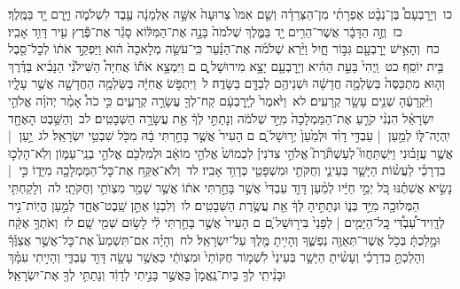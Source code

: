 \documentclass[18pt]{article}
\begin{document}
 {\loc כו~}וְיָרׇבְעָם֩ בֶּן־נְבָ֨ט אֶפְרָתִ֜י מִן־הַצְּרֵדָ֗ה וְשֵׁ֤ם אִמּוֹ֙ צְרוּעָה֙ אִשָּׁ֣ה אַלְמָנָ֔ה עֶ֖בֶד לִשְׁלֹמֹ֑ה וַיָּ֥רֶם יָ֖ד בַּמֶּֽלֶךְ׃ \startlock
 {\loc כז~}וְזֶ֣ה הַדָּבָ֔ר אֲשֶׁר־הֵרִ֥ים יָ֖ד בַּמֶּ֑לֶךְ שְׁלֹמֹה֙ בָּנָ֣ה אֶת־הַמִּלּ֔וֹא סָגַ֕ר אֶת־פֶּ֕רֶץ עִ֖יר דָּוִ֥ד אָבִֽיו׃ \startlock
 {\loc כח~}וְהָאִ֥ישׁ יָרׇבְעָ֖ם גִּבּ֣וֹר חָ֑יִל וַיַּ֨רְא שְׁלֹמֹ֜ה אֶת־הַנַּ֗עַר כִּֽי־עֹשֵׂ֤ה מְלָאכָה֙ ה֔וּא וַיַּפְקֵ֣ד אֹת֔וֹ לְכׇל־סֵ֖בֶל בֵּ֥ית יוֹסֵֽף׃ \startlock
 {\loc כט~}וַֽיְהִי֙ בָּעֵ֣ת הַהִ֔יא וְיָרׇבְעָ֖ם יָצָ֣א מִירוּשָׁל ָ֑͏ְם ם וַיִּמְצָ֣א אֹת֡וֹ אֲחִיָּה֩ הַשִּׁילֹנִ֨י הַנָּבִ֜יא בַּדֶּ֗רֶךְ וְה֤וּא מִתְכַּסֶּה֙ בְּשַׂלְמָ֣ה חֲדָשָׁ֔ה וּשְׁנֵיהֶ֥ם לְבַדָּ֖ם בַּשָּׂדֶֽה׃ \startlock
 {\loc ל~}וַיִּתְפֹּ֣שׂ אֲחִיָּ֔ה בַּשַּׂלְמָ֥ה הַחֲדָשָׁ֖ה אֲשֶׁ֣ר עָלָ֑יו וַיִּ֨קְרָעֶ֔הָ שְׁנֵ֥ים עָשָׂ֖ר קְרָעִֽים׃ \startlock
 {\loc לא~}וַיֹּ֙אמֶר֙ לְיָֽרׇבְעָ֔ם קַח־לְךָ֖ עֲשָׂרָ֣ה קְרָעִ֑ים כִּ֣י כֹה֩ אָמַ֨ר יְהֹוָ֜ה אֱלֹהֵ֣י יִשְׂרָאֵ֗ל הִנְנִ֨י קֹרֵ֤עַ אֶת־הַמַּמְלָכָה֙ מִיַּ֣ד שְׁלֹמֹ֔ה וְנָתַתִּ֣י לְךָ֔ אֵ֖ת עֲשָׂרָ֥ה הַשְּׁבָטִֽים׃ \startlock
 {\loc לב~}וְהַשֵּׁ֥בֶט הָאֶחָ֖ד יִֽהְיֶה־לּ֑וֹ לְמַ֣עַן  |  עַבְדִּ֣י דָוִ֗ד וּלְמַ֙עַן֙ יְר֣וּשָׁל ַ֔͏ְם ם הָעִיר֙ אֲשֶׁ֣ר בָּחַ֣רְתִּי בָ֔הּ מִכֹּ֖ל שִׁבְטֵ֥י יִשְׂרָאֵֽל׃ \startlock
 {\loc לג~}יַ֣עַן  |  אֲשֶׁ֣ר עֲזָב֗וּנִי וַיִּֽשְׁתַּחֲווּ֮ לְעַשְׁתֹּ֘רֶת֮ אֱלֹהֵ֣י צִדֹנִין֒ לִכְמוֹשׁ֙ אֱלֹהֵ֣י מוֹאָ֔ב וּלְמִלְכֹּ֖ם אֱלֹהֵ֣י בְנֵֽי־עַמּ֑וֹן וְלֹֽא־הָלְכ֣וּ בִדְרָכַ֗י לַעֲשׂ֨וֹת הַיָּשָׁ֧ר בְּעֵינַ֛י וְחֻקֹּתַ֥י וּמִשְׁפָּטַ֖י כְּדָוִ֥ד אָבִֽיו׃ \startlock
 {\loc לד~}וְלֹא־אֶקַּ֥ח אֶת־כׇּל־הַמַּמְלָכָ֖ה מִיָּד֑וֹ כִּ֣י  |  נָשִׂ֣יא אֲשִׁתֶ֗נּוּ כֹּ֚ל יְמֵ֣י חַיָּ֔יו לְמַ֨עַן דָּוִ֤ד עַבְדִּי֙ אֲשֶׁ֣ר בָּחַ֣רְתִּי אֹת֔וֹ אֲשֶׁ֥ר שָׁמַ֖ר מִצְוֺתַ֥י וְחֻקֹּתָֽי׃ \startlock
 {\loc לה~}וְלָקַחְתִּ֥י הַמְּלוּכָ֖ה מִיַּ֣ד בְּנ֑וֹ וּנְתַתִּ֣יהָ לְּךָ֔ אֵ֖ת עֲשֶׂ֥רֶת הַשְּׁבָטִֽים׃ \startlock
 {\loc לו~}וְלִבְנ֖וֹ אֶתֵּ֣ן שֵֽׁבֶט־אֶחָ֑ד לְמַ֣עַן הֱיֽוֹת־נִ֣יר לְדָֽוִיד־עַ֠בְדִּ֠י כׇּֽל־הַיָּמִ֤ים  |  לְפָנַי֙ בִּיר֣וּשָׁל ַ֔͏ְם ם הָעִיר֙ אֲשֶׁ֣ר בָּחַ֣רְתִּי לִ֔י לָשׂ֥וּם שְׁמִ֖י שָֽׁם׃ \startlock
 {\loc לז~}וְאֹתְךָ֣ אֶקַּ֔ח וּמָ֣לַכְתָּ֔ בְּכֹ֥ל אֲשֶׁר־תְּאַוֶּ֖ה נַפְשֶׁ֑ךָ וְהָיִ֥יתָ מֶּ֖לֶךְ עַל־יִשְׂרָאֵֽל׃ \startlock
 {\loc לח~}וְהָיָ֗ה אִם־תִּשְׁמַע֮ אֶת־כׇּל־אֲשֶׁ֣ר אֲצַוֶּ֒ךָ֒ וְהָלַכְתָּ֣ בִדְרָכַ֗י וְעָשִׂ֨יתָ הַיָּשָׁ֤ר בְּעֵינַי֙ לִשְׁמ֤וֹר חֻקּוֹתַי֙ וּמִצְוֺתַ֔י כַּאֲשֶׁ֥ר עָשָׂ֖ה דָּוִ֣ד עַבְדִּ֑י וְהָיִ֣יתִי עִמָּ֗ךְ וּבָנִ֨יתִֽי לְךָ֤ בַיִת־נֶֽאֱמָן֙ כַּאֲשֶׁ֣ר בָּנִ֣יתִי לְדָוִ֔ד וְנָתַתִּ֥י לְךָ֖ אֶת־יִשְׂרָאֵֽל׃ \startlock
\end{document}
